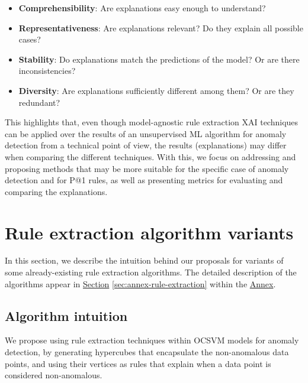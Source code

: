 \begin{itemize}
\item \textbf{Comprehensibility}: Are explanations easy enough to understand?
\item \textbf{Representativeness}: Are explanations relevant? Do they explain all possible cases?
\item \textbf{Stability}: Do explanations match the predictions of the model? Or are there inconsistencies?
\item \textbf{Diversity}: Are explanations sufficiently different among them? Or are they redundant?
\end{itemize}

This highlights that, even though model-agnostic rule extraction XAI techniques can be applied over the results of an unsupervised ML algorithm for anomaly detection from a technical point of view, the results (explanations) may differ when comparing the different techniques. With this, we focus on addressing and proposing methods that may be more suitable for the specific case of anomaly detection and for P@1 rules, as well as presenting metrics for evaluating and comparing the explanations.

\section{Rule extraction algorithm variants}\label{sec:RuleExtractionVariants}
In this section, we describe the intuition behind our proposals for variants of some already-existing rule extraction algorithms. The detailed description of the algorithms appear in \hyperref[sec:annex-rule-extraction]{Section} \ref{sec:annex-rule-extraction} within the \hyperref[ch:annex]{Annex}.

\subsection{Algorithm intuition}\label{subsec:RuleExtractionAlgorithmIntuition}
We propose using rule extraction techniques within OCSVM models for anomaly detection, by generating hypercubes that encapsulate the non-anomalous data points, and using their vertices as rules that explain when a data point is considered non-anomalous.

